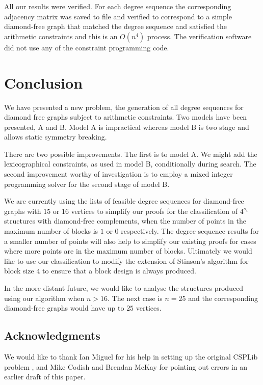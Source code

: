 \documentclass{l4proj}
\begin{document}
All our results were verified. For each degree sequence the corresponding adjacency matrix 
was saved to file and verified to correspond to a simple diamond-free graph that matched the degree sequence and 
satisfied the arithmetic constraints and this is an $O(n^{4})$ process. The verification software did not use 
any of the constraint programming code.

\chapter{Conclusion}
\label{sec:conc}
\vspace{-3mm}
We have presented a new problem, the generation of all degree sequences for diamond free
graphs subject to arithmetic constraints. Two models have been presented, A and B. Model A is
impractical whereas model B is two stage and allows static symmetry breaking.

There are two possible improvements. The first is to model A. We might add the lexicographical
constraints, as used in model B, conditionally during search. The second improvement worthy
of investigation is to employ a mixed integer programming solver for the second stage 
of model B.

We are currently using the lists of feasible degree sequences for
diamond-free graphs with $15$ or $16$ vertices to simplify our proofs
for the classification of $4^{s_{4}}$ structures with diamond-free
complements, when the number of points in the maximum number of blocks
is $1$ or $0$ respectively. The degree sequence results for a smaller
number of points will also help to simplify our existing proofs for
cases where more points are in the maximum number of
blocks. Ultimately we would like to use our classification to modify
the extension of Stinson's algorithm for block size $4$ to ensure that
a block design is always produced. 

In the more distant future, we would like to analyse the structures
produced using our algorithm when $n>16$. The next case is $n=25$ and
the corresponding diamond-free graphs would have up to $25$
vertices.

\section*{Acknowledgments}
\label{sec:ack}
\vspace{-3mm}
We would like to thank Ian Miguel for his help in setting up the original CSPLib problem \cite{CSPLib},  and Mike Codish and Brendan McKay for pointing out errors in an earlier draft of this paper.




\end{document}
